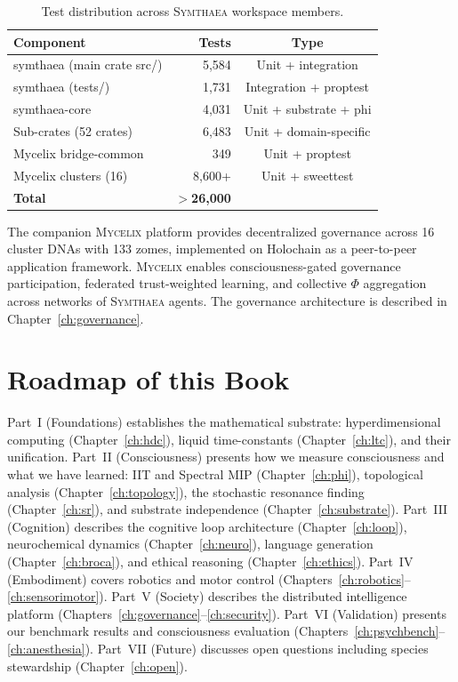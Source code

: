 \documentclass[12pt]{book}
\newcommand{\symthaea}{\textsc{Symthaea}}
\newcommand{\mycelix}{\textsc{Mycelix}}
\begin{document}
\begin{table}[H]
\centering
\caption{Test distribution across \symthaea{} workspace members.}
\label{tab:test-distribution}
\begin{tabular}{lrc}
\toprule
\textbf{Component} & \textbf{Tests} & \textbf{Type} \\
\midrule
symthaea (main crate src/) & 5,584 & Unit + integration \\
symthaea (tests/) & 1,731 & Integration + proptest \\
symthaea-core & 4,031 & Unit + substrate + phi \\
Sub-crates (52 crates) & 6,483 & Unit + domain-specific \\
Mycelix bridge-common & 349 & Unit + proptest \\
Mycelix clusters (16) & 8,600+ & Unit + sweettest \\
\midrule
\textbf{Total} & \textbf{$>$26,000} & \\
\bottomrule
\end{tabular}
\end{table}

The companion \mycelix{} platform provides decentralized governance across 16 cluster DNAs with 133 zomes, implemented on Holochain as a peer-to-peer application framework. \mycelix{} enables consciousness-gated governance participation, federated trust-weighted learning, and collective $\Phi$ aggregation across networks of \symthaea{} agents. The governance architecture is described in Chapter~\ref{ch:governance}.

\section{Roadmap of this Book}

Part~I (Foundations) establishes the mathematical substrate: hyperdimensional computing (Chapter~\ref{ch:hdc}), liquid time-constants (Chapter~\ref{ch:ltc}), and their unification. Part~II (Consciousness) presents how we measure consciousness and what we have learned: IIT and Spectral MIP (Chapter~\ref{ch:phi}), topological analysis (Chapter~\ref{ch:topology}), the stochastic resonance finding (Chapter~\ref{ch:sr}), and substrate independence (Chapter~\ref{ch:substrate}). Part~III (Cognition) describes the cognitive loop architecture (Chapter~\ref{ch:loop}), neurochemical dynamics (Chapter~\ref{ch:neuro}), language generation (Chapter~\ref{ch:broca}), and ethical reasoning (Chapter~\ref{ch:ethics}). Part~IV (Embodiment) covers robotics and motor control (Chapters~\ref{ch:robotics}--\ref{ch:sensorimotor}). Part~V (Society) describes the distributed intelligence platform (Chapters~\ref{ch:governance}--\ref{ch:security}). Part~VI (Validation) presents our benchmark results and consciousness evaluation (Chapters~\ref{ch:psychbench}--\ref{ch:anesthesia}). Part~VII (Future) discusses open questions including species stewardship (Chapter~\ref{ch:open}).
\end{document}
